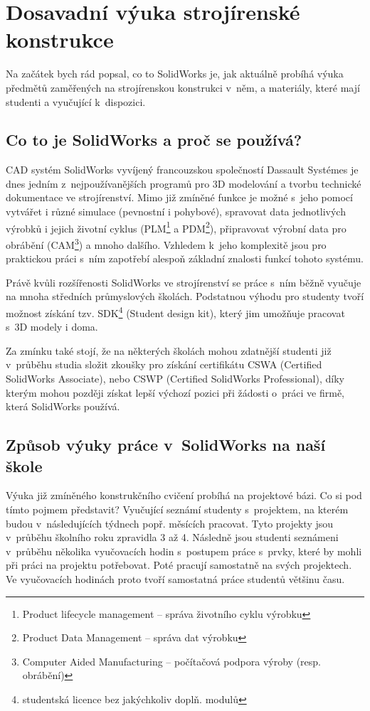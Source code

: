 \chapter{Dosavadní výuka strojírenské konstrukce}
Na začátek bych rád popsal, co to SolidWorks je, jak aktuálně probíhá výuka předmětů zaměřených na strojírenskou konstrukci v~něm, a materiály, které mají studenti a vyučující k~dispozici.

\section{Co to je SolidWorks a proč se používá?}
    CAD systém SolidWorks vyvíjený francouzskou společností Dassault Systémes je dnes jedním z~nejpoužívanějších programů pro 3D modelování a tvorbu technické dokumentace ve strojírenství.
    Mimo již zmíněné funkce je možné s~jeho pomocí vytvářet i různé simulace (pevnostní i pohybové), spravovat data jednotlivých výrobků i jejich životní cyklus (PLM\footnote{Product lifecycle management -- správa životního cyklu výrobku} a PDM\footnote{Product Data Management -- správa dat výrobku}), připravovat výrobní data pro obrábění (CAM\footnote{Computer Aided Manufacturing -- počítačová podpora výroby (resp. obrábění)}) a mnoho dalšího.
    Vzhledem k~jeho komplexitě jsou pro praktickou práci s~ním zapotřebí alespoň základní znalosti funkcí tohoto systému.

    Právě kvůli rozšířenosti SolidWorks ve strojírenství se práce s~ním běžně vyučuje na mnoha středních průmyslových školách.
    Podstatnou výhodu pro studenty tvoří možnost získání tzv. SDK\footnote{studentská licence bez jakýchkoliv doplň. modulů} (Student design kit), který jim umožňuje pracovat s~3D modely i doma.

    Za zmínku také stojí, že na některých školách mohou zdatnější studenti již v~průběhu studia složit zkoušky pro získání certifikátu CSWA (Certified SolidWorks Associate), nebo CSWP (Certified SolidWorks Professional), díky kterým mohou později získat lepší výchozí pozici při žádosti o~práci ve firmě, která SolidWorks používá.

\section{Způsob výuky práce v~SolidWorks na naší škole}
    Výuka již zmíněného konstrukčního cvičení probíhá na projektové bázi.
    Co si pod tímto pojmem představit?
    Vyučující seznámí studenty s~projektem, na kterém budou v~následujících týdnech popř. měsících pracovat. 
    Tyto projekty jsou v~průběhu školního roku zpravidla 3 až 4.
    Následně jsou studenti seznámeni v~průběhu několika vyučovacích hodin s~postupem práce s~prvky, které by mohli při práci na projektu potřebovat.
    Poté pracují samostatně na svých projektech.
    Ve vyučovacích hodinách proto tvoří samostatná práce studentů většinu času.

